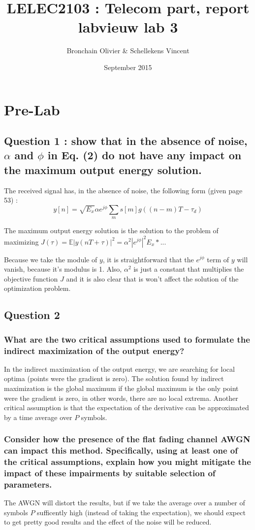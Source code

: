 \documentclass{article}
\title{LELEC2103 : Telecom part, report labvieuw lab 3}
\author{Bronchain Olivier \& Schellekens Vincent }
\date{September 2015}
\begin{document}
\maketitle

\section{Pre-Lab}
    \subsection{Question 1 : show that in the absence of noise, $\alpha$ and $\phi$ in Eq. (2) do not have any impact on the maximum output energy solution.}
    The received signal has, in the absence of noise, the following form (given page 53) : 
    \begin{equation}
    y[n] = \sqrt{E_x} \alpha e^{j \phi} \sum_m s[m]g((n-m)T - \tau_d)
    \end{equation}
    
    The maximum output energy solution is the solution to the problem of maximizing $J(\tau) = \mathbb{E}|y(nT+\tau)|^2 = \alpha^2 |e^{j \phi}|^2 E_x * ...$
    
    Because we take the module of $y$, it is straightforward that the $e^{j \phi}$ term of $y$ will vanish, because it's modulus is 1. Also, $\alpha^2$ is just a constant that multiplies the objective function $J$ and it is also clear that is won't affect the solution of the optimization problem.
    
    \subsection{Question 2}
    \subsubsection{What are the two critical assumptions used to formulate the indirect
maximization of the output energy?}
    In the indirect maximization of the output energy, we are searching for local optima (points were the gradient is zero). The solution found by indirect maximization is the global maximum if the global maximum is the only point were the gradient is zero, in other words, there are no local extrema.
    Another critical assumption is that the expectation of the derivative can be approximated by a time average over $P$ symbols.
    \subsubsection{Consider how the presence of the
flat fading channel AWGN can impact this method. Specifically, using
at least one of the critical assumptions, explain how you might mitigate
the impact of these impairments by suitable selection of parameters.}
    The AWGN will distort the results, but if we take the average over a number of symbols $P$ sufficently high (instead of taking the expectation), we should expect to get pretty good results and the effect of the noise will be reduced.
\end{document}

